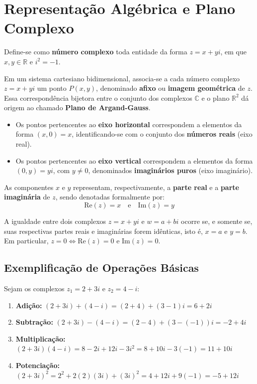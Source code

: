 \documentclass[12pt,a4paper]{article}
\begin{document}
\section{Representação Algébrica e Plano Complexo}

Define-se como \textbf{número complexo} toda entidade da forma $z = x + yi$, em que $x, y \in \mathbb{R}$ e $i^2 = -1$.

Em um sistema cartesiano bidimensional, associa-se a cada número complexo $z = x + yi$ um ponto $P(x, y)$, denominado \textbf{afixo} ou \textbf{imagem geométrica} de $z$. Essa correspondência bijetora entre o conjunto dos complexos $\mathbb{C}$ e o plano $\mathbb{R}^2$ dá origem ao chamado \textbf{Plano de Argand-Gauss}.

\begin{itemize}[label=\textcolor{secondary}{$\bullet$}]
    \item Os pontos pertencentes ao \textbf{eixo horizontal} correspondem a elementos da forma $(x, 0) = x$, identificando-se com o conjunto dos \textbf{números reais} (eixo real).
    \item Os pontos pertencentes ao \textbf{eixo vertical} correspondem a elementos da forma $(0, y) = yi$, com $y \neq 0$, denominados \textbf{imaginários puros} (eixo imaginário).
\end{itemize}

As componentes $x$ e $y$ representam, respectivamente, a \textbf{parte real} e a \textbf{parte imaginária} de $z$, sendo denotadas formalmente por:
\[
\text{Re}(z) = x \quad \text{e} \quad \text{Im}(z) = y
\]

A igualdade entre dois complexos $z = x + yi$ e $w = a + bi$ ocorre se, e somente se, suas respectivas partes reais e imaginárias forem idênticas, isto é, $x = a$ e $y = b$. Em particular, $z = 0 \iff \text{Re}(z) = 0$ e $\text{Im}(z) = 0$.

\subsection*{Exemplificação de Operações Básicas}

\begin{exemplobox}
Sejam os complexos $z_1 = 2 + 3i$ e $z_2 = 4 - i$:
\begin{enumerate}[label=\alph*)]
    \item \textbf{Adição:} $(2 + 3i) + (4 - i) = (2 + 4) + (3 - 1)i = 6 + 2i$
    \item \textbf{Subtração:} $(2 + 3i) - (4 - i) = (2 - 4) + (3 - (-1))i = -2 + 4i$
    \item \textbf{Multiplicação:} $(2 + 3i)(4 - i) = 8 - 2i + 12i - 3i^2 = 8 + 10i - 3(-1) = 11 + 10i$
    \item \textbf{Potenciação:} $(2 + 3i)^2 = 2^2 + 2(2)(3i) + (3i)^2 = 4 + 12i + 9(-1) = -5 + 12i$
\end{enumerate}
\end{exemplobox}
\end{document}
